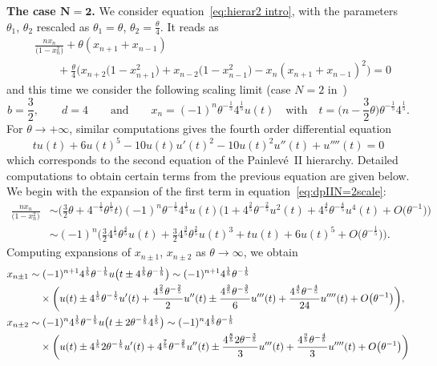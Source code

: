 \documentclass[pdftex]{sigma}%
\numberwithin{equation}{section}
\begin{document}
{\bf The case $\boldsymbol{N=2}$.} We consider equation~\eqref{eq:hierar2 intro}, with the parameters $\theta_1$, $\theta_2$ rescaled as
$\theta_1=\theta$, $\theta_2 = \frac{\theta}{4}$. It reads as
\begin{align}
	&\frac{n x_n}{\big(1-x_n^2\big)}+\theta(x_{n+1}+x_{n-1})\nonumber
\\
&{}\qquad+\frac{\theta}{4}\big(x_{n+2}\big(1-x_{n+1}^2\big)+x_{n-2}\big(1-x_{n-1}^2\big)-x_n(x_{n+1}+x_{n-1})^2\big)=0
	\label{eq:dpIIN=2scale}
\end{align}
and this time we consider the following scaling limit (case $N=2$ in~\cite[Theorem~1]{betea2021multicritical})
\begin{equation*}
	b=\frac{3}{2}, \qquad
d=4\qquad\text{and}\qquad x_n=(-1)^n\theta^{-\frac{1}{5}}4^{\frac{1}{5}} u(t)
\quad\text{with}\quad t=\bigg(n-\frac{3}{2}\theta\bigg)\theta^{-\frac{1}{5}}4^{\frac{1}{5}}.
\end{equation*}
For $\theta \rightarrow +\infty$, similar computations gives the fourth order differential equation
\begin{equation*}
	t u(t) + 6 u(t)^5 - 10 u(t)u'(t)^2 -
	10 u(t)^2 u''(t) + u''''(t)=0
\end{equation*}
which corresponds to the second equation of the Painlev\'e~II hierarchy. Detailed computations to obtain certain terms from the previous equation are given below. We begin with the expansion of the first term in equation~\eqref{eq:dpIIN=2scale}:
\begin{align*}
	\frac{nx_n}{\big(1-x_n^2\big)}&\sim \bigg(\frac{3}{2}\theta+4^{-\frac{1}{5}}\theta^{\frac{1}{5}}t\bigg)(-1)^n\theta^{-\frac{1}{5}}4^{\frac{1}{5}} u(t) \big(1 + 4^{\frac{2}{5}}\theta^{-\frac{2}{5}}u^2(t) +4^{\frac{4}{5}}\theta^{-\frac{4}{5}}u^4(t)+O\big(\theta^{-1}\big)\big)
\\
	&\sim (-1)^n\bigg(\frac{3}{2}4^{\frac{1}{5}}\theta^{\frac{4}{5}} u(t)+\frac{3}{2}4^{\frac{3}{5}}\theta^{\frac{2}{5}} u(t)^3+tu(t)+6u(t)^5+O\big(\theta^{-\frac{1}{5}}\big)\bigg).
\end{align*}
Computing expansions of $x_{n\pm 1}$, $x_{n\pm 2}$ as $\theta\to\infty$, we obtain
\begin{align*}
&x_{n\pm 1} \sim (-1)^{n+1}4^{\frac{1}{5}}\theta^{-\frac{1}{5}} u\big(t\pm 4^{\frac{1}{5}}\theta^{-\frac{1}{5}}\big)
\sim (-1)^{n+1}4^{\frac{1}{5}}\theta^{-\frac{1}{5}}
\\
&\hphantom{x_{n\pm 1} \sim}
\times \bigg(u(t)\pm4^{\frac{1}{5}}\theta^{-\frac{1}{5}}u'(t) +\frac{4^{\frac{2}{5}}\theta^{-\frac{2}{5}}}{2}u''(t)\pm\frac{4^{\frac{3}{5}}\theta^{-\frac{3}{5}}}{6}u'''(t) +\frac{4^{\frac{4}{5}}\theta^{-\frac{4}{5}}}{24}u''''(t)+O\big(\theta^{-1}\big)\bigg),
\\
&	x_{n\pm 2}\sim (-1)^{n}4^{\frac{1}{5}}\theta^{-\frac{1}{5}} u\big(t\pm 2\theta^{-\frac{1}{5}}4^{\frac{1}{5}}\big)
\sim (-1)^{n}4^{\frac{1}{5}}\theta^{-\frac{1}{5}}
\\
&\hphantom{x_{n\pm 2}\sim}
\times\bigg(u(t)\pm 4^{\frac{1}{5}}2\theta^{-\frac{1}{5}}u'(t) +4^{\frac{7}{5}}\theta^{-\frac{2}{5}}u''(t)\pm\frac{4^{\frac{8}{5}}2\theta^{-\frac{3}{5}}}{3}u'''(t) +\frac{4^{\frac{9}{5}}\theta^{-\frac{4}{5}}}{3}u''''(t)+O\big(\theta^{-1}\big)\bigg)
\end{align*}
\end{document}
